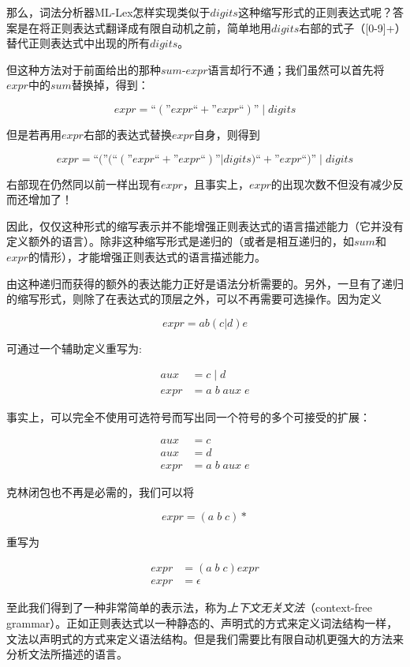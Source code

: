 \documentclass[cn,11pt,chinese]{elegantbook}
\begin{document}
那么，词法分析器ML-Lex怎样实现类似于$digits$这种缩写形式的正则表达式呢？答案是在将正则表达式翻译成有限自动机之前，简单地用$digits$右部的式子（[0-9]+）替代正则表达式中出现的所有$digits$。

但这种方法对于前面给出的那种$sum$-$expr$语言却行不通；我们虽然可以首先将$expr$中的$sum$替换掉，得到：

$$
expr=\text{``}(\text{''}expr\text{``}+\text{''}expr\text{``})\text{''} \; | \; digits
$$

但是若再用$expr$右部的表达式替换$expr$自身，则得到

$$
expr=\text{``}(\text{''}(\text{``}(\text{''}expr\text{``}+\text{''}expr\text{``})\text{''}|digits)\text{``}+\text{''}expr\text{``})\text{''} \; | \; digits
$$

右部现在仍然同以前一样出现有$expr$，且事实上，$expr$的出现次数不但没有减少反而还增加了！

因此，仅仅这种形式的缩写表示并不能增强正则表达式的语言描述能力（它并没有定义额外的语言）。除非这种缩写形式是递归的（或者是相互递归的，如$sum$和$expr$的情形），才能增强正则表达式的语言描述能力。

由这种递归而获得的额外的表达能力正好是语法分析需要的。另外，一旦有了递归的缩写形式，则除了在表达式的顶层之外，可以不再需要可选操作。因为定义

$$
expr=ab(c|d)e
$$

可通过一个辅助定义重写为:

\begin{align*}
aux &= c \; | \; d \\
expr &=a \; b \; aux \; e  
\end{align*}

事实上，可以完全不使用可选符号而写出同一个符号的多个可接受的扩展：

\begin{align*}
aux &= c \\
aux &= d \\
expr &= a \; b \; aux \; e
\end{align*}

克林闭包也不再是必需的，我们可以将

$$
expr=(a \; b \; c)*
$$

重写为

\begin{align*}
expr &= (a \; b \; c)expr \\
expr &= \epsilon
\end{align*}

至此我们得到了一种非常简单的表示法，称为\textit{上下文无关文法}（context-free grammar）。正如正则表达式以一种静态的、声明式的方式来定义词法结构一样，文法以声明式的方式来定义语法结构。但是我们需要比有限自动机更强大的方法来分析文法所描述的语言。
\end{document}
